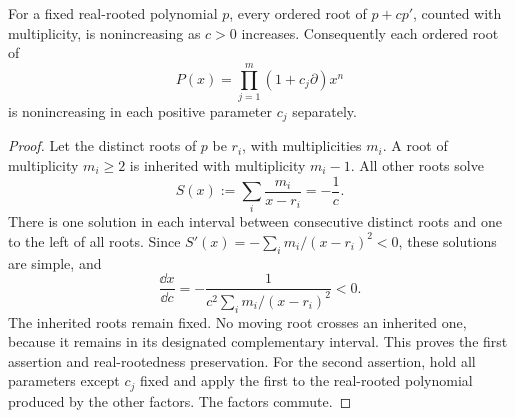 \begin{lemma}
\label{mesh:lem:motion}
For a fixed real-rooted polynomial $p$, every ordered root of
$p+c p'$, counted with multiplicity, is nonincreasing as $c>0$ increases.
Consequently each ordered root of
\[
 P(x)=\prod_{j=1}^m(1+c_j\partial)x^n
\]
is nonincreasing in each positive parameter $c_j$ separately.
\end{lemma}
\begin{proof}
Let the distinct roots of $p$ be $r_i$, with multiplicities $m_i$.
A root of multiplicity $m_i\geq2$ is inherited with multiplicity
$m_i-1$. All other roots solve
\[
 S(x):=\sum_i\frac{m_i}{x-r_i}=-\frac1c.
\]
There is one solution in each interval between consecutive distinct
roots and one to the left of all roots. Since
$S'(x)=-\sum_i m_i/(x-r_i)^2<0$, these solutions are simple, and
\begin{equation}\label{mesh:eq:root-motion}
 \frac{\dd x}{\dd c}
   =-\frac1{c^2\displaystyle\sum_i m_i/(x-r_i)^2}<0.
\end{equation}
The inherited roots remain fixed. No moving root crosses an inherited
one, because it remains in its designated complementary interval.
This proves the first assertion and real-rootedness preservation.
For the second assertion, hold all parameters except $c_j$ fixed and
apply the first to the real-rooted polynomial produced by the other
factors. The factors commute.
\end{proof}

